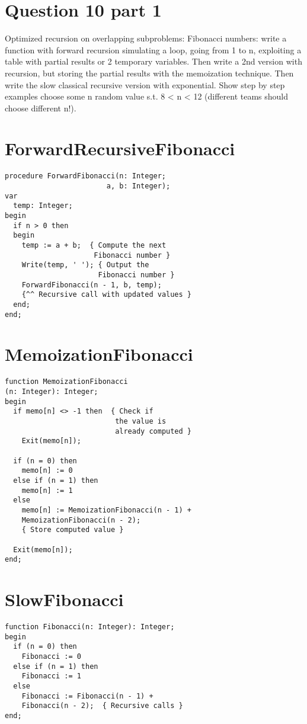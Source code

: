 \documentclass[conference]{IEEEtran}
\begin{document}
\section{Question 10 part 1}
%
Optimized recursion on overlapping subproblems:
Fibonacci numbers: write a function with forward recursion simulating a loop, going from 1 to
n, exploiting a table with partial results or 2 temporary variables. Then write a 2nd version with
recursion, but storing the partial results with the memoization technique. Then write the slow
classical recursive version with exponential. Show step by step examples choose some n
random value s.t. 8 < n < 12 (different teams should choose different n!).




\section{ForwardRecursiveFibonacci}

\begin{verbatim}
procedure ForwardFibonacci(n: Integer; 
                        a, b: Integer);
var
  temp: Integer;
begin
  if n > 0 then
  begin
    temp := a + b;  { Compute the next
                     Fibonacci number }
    Write(temp, ' '); { Output the 
                      Fibonacci number }
    ForwardFibonacci(n - 1, b, temp); 
    {^^ Recursive call with updated values }
  end;
end;
\end{verbatim}


\section{MemoizationFibonacci}
\begin{verbatim}
function MemoizationFibonacci
(n: Integer): Integer;
begin
  if memo[n] <> -1 then  { Check if 
                          the value is 
                          already computed }
    Exit(memo[n]);

  if (n = 0) then
    memo[n] := 0
  else if (n = 1) then
    memo[n] := 1
  else
    memo[n] := MemoizationFibonacci(n - 1) +
    MemoizationFibonacci(n - 2);  
    { Store computed value }

  Exit(memo[n]);
end;
\end{verbatim}

\section{SlowFibonacci}
\begin{verbatim}
function Fibonacci(n: Integer): Integer;
begin
  if (n = 0) then
    Fibonacci := 0
  else if (n = 1) then
    Fibonacci := 1
  else
    Fibonacci := Fibonacci(n - 1) + 
    Fibonacci(n - 2);  { Recursive calls }
end;

\end{verbatim}
\end{document}
